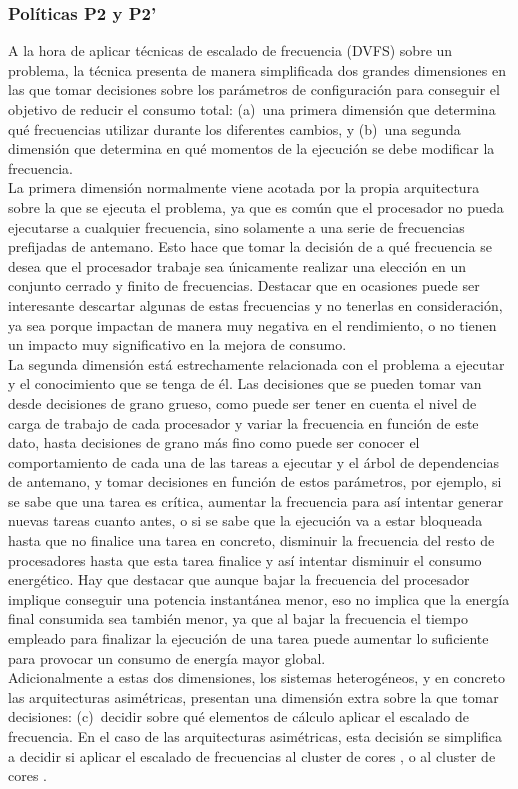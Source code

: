 \subsubsection{Políticas P2 y P2'}
 A la hora de aplicar
técnicas de escalado de frecuencia (DVFS) sobre un problema, la técnica
presenta de manera simplificada dos grandes dimensiones en las que tomar
decisiones sobre los parámetros de configuración para conseguir el objetivo
de reducir el consumo total: (a)~una primera dimensión que determina qué
frecuencias utilizar durante los diferentes cambios, y (b)~una segunda
dimensión que determina en qué momentos de la ejecución se debe modificar
la frecuencia.\\
La primera dimensión normalmente viene acotada por la propia arquitectura
sobre la que se ejecuta el problema, ya que es común que el procesador no
pueda ejecutarse a cualquier frecuencia, sino solamente a una serie de
frecuencias prefijadas de antemano. Esto hace que tomar la decisión de a
qué frecuencia se desea que el procesador trabaje sea únicamente realizar
una elección en un conjunto cerrado y finito de frecuencias. Destacar que
en ocasiones puede ser interesante descartar algunas de estas frecuencias y
no tenerlas en consideración, ya sea porque impactan de manera muy negativa
en el rendimiento, o no tienen un impacto muy significativo en la mejora de
consumo.\\
La segunda dimensión está estrechamente relacionada con el problema a
ejecutar y el conocimiento que se tenga de él. Las decisiones que se pueden
tomar van desde decisiones de grano grueso, como puede ser tener en cuenta
el nivel de carga de trabajo de cada procesador y variar la frecuencia en
función de este dato, hasta decisiones de grano más fino como puede ser
conocer el comportamiento de cada una de las tareas a ejecutar y el árbol
de dependencias de antemano, y tomar decisiones en función de estos
parámetros, por ejemplo, si se sabe que una tarea es crítica, aumentar la
frecuencia para así intentar generar nuevas tareas cuanto antes, o si se
sabe que la ejecución va a estar bloqueada hasta que no finalice una tarea
en concreto, disminuir la frecuencia del resto de procesadores hasta que
esta tarea finalice y así intentar disminuir el consumo energético. Hay que
destacar que aunque bajar la frecuencia del procesador implique conseguir
una potencia instantánea menor, eso no implica que la energía final
consumida sea también menor, ya que al bajar la frecuencia el tiempo
empleado para finalizar la ejecución de una tarea puede aumentar lo
suficiente para provocar un consumo de energía mayor global.\\
Adicionalmente a estas dos dimensiones, los sistemas heterogéneos, y en
concreto las arquitecturas asimétricas, presentan una dimensión extra sobre
la que tomar decisiones: (c)~decidir sobre qué elementos de cálculo aplicar
el escalado de frecuencia. En el caso de las arquitecturas asimétricas,
esta decisión se simplifica a decidir si aplicar el escalado de frecuencias
al cluster de cores \BIG, o al cluster de cores \LITTLE.\\
\comentario{}

